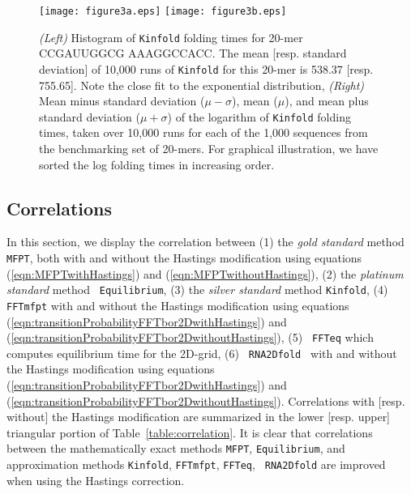 \begin{figure*}
\centering
\texttt{[image: figure3a.eps]}
\texttt{[image: figure3b.eps]}
\caption{{\em (Left)} Histogram of {\tt Kinfold} folding times for 20-mer CCGAUUGGCG AAAGGCCACC. The mean [resp. standard deviation] of 10,000 runs of {\tt Kinfold} for this 20-mer is 538.37 [resp. 755.65]. Note the close fit to the exponential distribution, {\em (Right)} Mean minus standard deviation ($\mu -\sigma$), mean ($\mu$), and mean plus standard deviation ($\mu + \sigma$) of the logarithm of {\tt Kinfold} folding times, taken over 10,000 runs for each of the 1,000 sequences from the benchmarking set of 20-mers. For graphical illustration, we have sorted the log folding times in increasing order. } \label{fig:meanStdevKinfoldRuns1000sequences}
\end{figure*}



\subsection{Correlations}

In this section, we display the correlation between (1) the {\em gold
standard} method {\tt MFPT}, both with and without the Hastings
modification using equations (\ref{eqn:MFPTwithHastings}) and
(\ref{eqn:MFPTwithoutHastings}), (2) the {\em platinum standard} method {\tt
Equilibrium}, (3) the {\em silver standard} method {\tt Kinfold}, (4) {\tt
FFTmfpt} with and without the Hastings modification using equations
(\ref{eqn:transitionProbabilityFFTbor2DwithHastings}) and
(\ref{eqn:transitionProbabilityFFTbor2DwithoutHastings}), (5) {\tt
FFTeq} which computes equilibrium time for the 2D-grid, (6) {\tt
RNA2Dfold } with and without the Hastings modification using equations
(\ref{eqn:transitionProbabilityFFTbor2DwithHastings}) and
(\ref{eqn:transitionProbabilityFFTbor2DwithoutHastings}). Correlations
with [resp. without] the Hastings modification are summarized in the
lower [resp. upper] triangular portion of
Table~\ref{table:correlation}. It is clear that correlations between
the mathematically exact methods {\tt MFPT}, {\tt Equilibrium}, and
approximation methods {\tt Kinfold}, {\tt FFTmfpt}, {\tt FFTeq}, {\tt
RNA2Dfold} are improved when using the Hastings correction.

